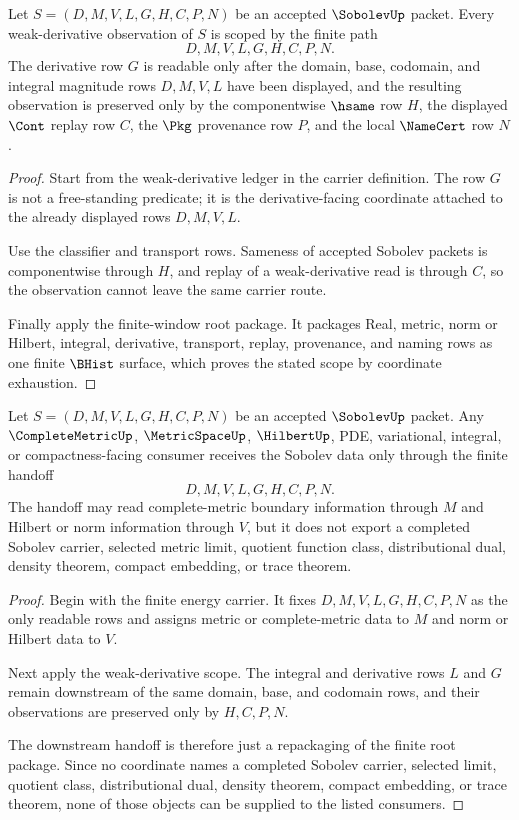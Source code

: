 \begin{theorem}
\label{thm:sobolev-weak-derivative-scope}
Let $S=(D,M,V,L,G,H,C,P,N)$ be an accepted $\SobolevUp$ packet. Every weak-derivative observation of $S$ is scoped by the finite path
$$
D,M,V,L,G,H,C,P,N .
$$
The derivative row $G$ is readable only after the domain, base, codomain, and integral magnitude rows $D,M,V,L$ have been displayed, and the resulting observation is preserved only by the componentwise $\hsame$ row $H$, the displayed $\Cont$ replay row $C$, the $\Pkg$ provenance row $P$, and the local $\NameCert$ row $N$.
\end{theorem}
\begin{proof}
Start from the weak-derivative ledger in the carrier definition. The row $G$ is not a free-standing predicate; it is the derivative-facing coordinate attached to the already displayed rows $D,M,V,L$.

Use the classifier and transport rows. Sameness of accepted Sobolev packets is componentwise through $H$, and replay of a weak-derivative read is through $C$, so the observation cannot leave the same carrier route.

Finally apply the finite-window root package. It packages Real, metric, norm or Hilbert, integral, derivative, transport, replay, provenance, and naming rows as one finite $\BHist$ surface, which proves the stated scope by coordinate exhaustion.
\end{proof}

\begin{theorem}
\label{thm:sobolev-complete-metric-handoff}
Let $S=(D,M,V,L,G,H,C,P,N)$ be an accepted $\SobolevUp$ packet. Any $\CompleteMetricUp$, $\MetricSpaceUp$, $\HilbertUp$, PDE, variational, integral, or compactness-facing consumer receives the Sobolev data only through the finite handoff
$$
D,M,V,L,G,H,C,P,N .
$$
The handoff may read complete-metric boundary information through $M$ and Hilbert or norm information through $V$, but it does not export a completed Sobolev carrier, selected metric limit, quotient function class, distributional dual, density theorem, compact embedding, or trace theorem.
\end{theorem}
\begin{proof}
Begin with the finite energy carrier. It fixes $D,M,V,L,G,H,C,P,N$ as the only readable rows and assigns metric or complete-metric data to $M$ and norm or Hilbert data to $V$.

Next apply the weak-derivative scope. The integral and derivative rows $L$ and $G$ remain downstream of the same domain, base, and codomain rows, and their observations are preserved only by $H,C,P,N$.

The downstream handoff is therefore just a repackaging of the finite root package. Since no coordinate names a completed Sobolev carrier, selected limit, quotient class, distributional dual, density theorem, compact embedding, or trace theorem, none of those objects can be supplied to the listed consumers.
\end{proof}

